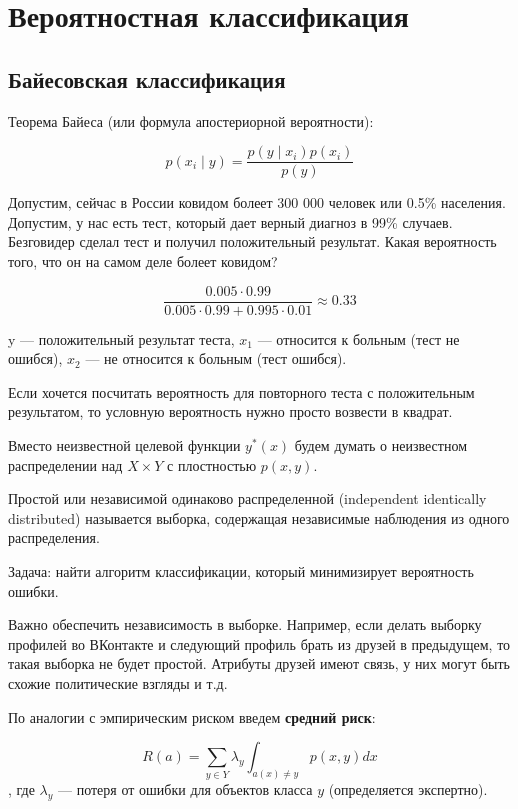 \section{Вероятностная классификация}

\subsection{Байесовская классификация}

Теорема Байеса (или формула апостериорной вероятности):

\[
    p(x_i \mid y) = \frac{p(y \mid x_i) p(x_i)}{p(y)}
\]

Допустим, сейчас в России ковидом болеет 300 000 человек или 0.5\% населения.
Допустим, у нас есть тест, который дает верный диагноз в 99\% случаев.
Безговидер сделал тест и получил положительный результат. Какая вероятность
того, что он на самом деле болеет ковидом?

\[
    \frac{0.005 \cdot 0.99}{0.005 \cdot 0.99 + 0.995 \cdot 0.01} \approx 0.33
\]

y --- положительный результат теста, $x_1$ --- относится к больным (тест не
ошибся), $x_2$ --- не относится к больным (тест ошибся).

Если хочется посчитать вероятность для повторного теста с положительным
результатом, то условную вероятность нужно просто возвести в квадрат.

Вместо неизвестной целевой функции $y^*(x)$ будем думать о неизвестном
распределении над $X \times Y$ с плостностью $p(x, y)$. 

Простой или независимой одинаково распределенной (independent identically
distributed) называется выборка, содержащая независимые наблюдения из одного
распределения.

Задача: найти алгоритм классификации, который минимизирует вероятность ошибки.

Важно обеспечить независимость в выборке. Например, если делать выборку
профилей во ВКонтакте и следующий профиль брать из друзей в предыдущем, то
такая выборка не будет простой. Атрибуты друзей имеют связь, у них могут быть
схожие политические взгляды и т.д.

По аналогии с эмпирическим риском введем \textbf{средний риск}:

\[
    R(a) = \sum_{y \in Y} \lambda_y \int_{a(x) \neq y} p(x, y) dx
\], где $\lambda_y$ --- потеря от ошибки для объектов класса $y$ (определяется
экспертно).


